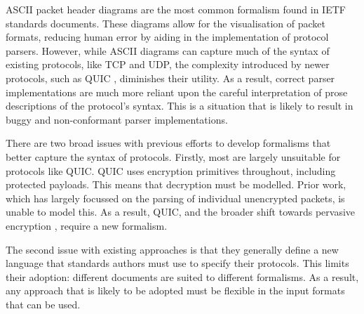 \documentclass[10pt,sigconf]{acmart}
\begin{document}
ASCII packet header diagrams are the most common formalism found in IETF standards
documents. These diagrams allow for the visualisation of packet formats, reducing human error
by aiding in the implementation of protocol parsers. However, while ASCII diagrams can
capture much of the syntax of existing protocols, like TCP and UDP, the complexity
introduced by newer protocols, such as QUIC \cite{draft-ietf-quic-transport-latest},
diminishes their utility. As a result, correct parser implementations are much more
reliant upon the careful interpretation of prose descriptions of the protocol's syntax.
This is a situation that is likely to result in buggy and non-conformant parser implementations.


There are two broad issues with previous efforts to develop formalisms that better capture
the syntax of protocols. Firstly, most are largely unsuitable for protocols like QUIC.
QUIC uses encryption primitives throughout, including protected payloads. This means that
decryption must be modelled. Prior work, which has largely focussed on the parsing of
individual unencrypted packets, is unable to model this. As a result, QUIC, and the broader
shift towards pervasive encryption \cite{rfc7258}, require a new formalism.

The second issue with existing approaches is that they generally define a new language
that standards authors must use to specify their protocols. This limits their adoption:
different documents are suited to different formalisms. As a result,
any approach that is likely to be adopted must be flexible in the input formats that can
be used.

\end{document}
